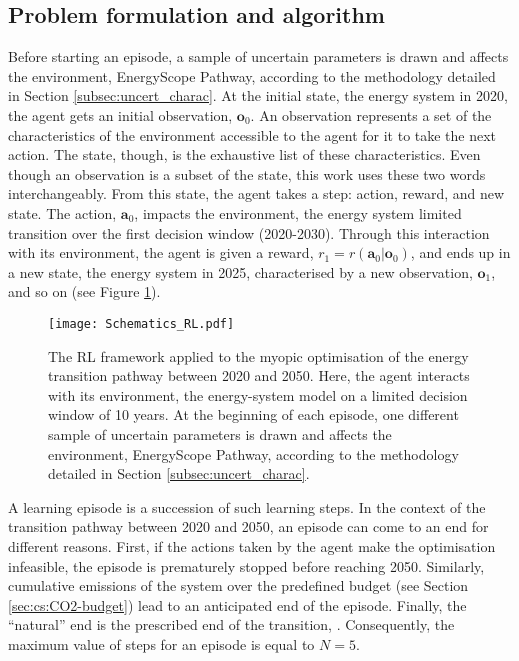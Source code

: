 \subsection{Problem formulation and algorithm}
\label{subsec:meth_RL_algo}
Before starting an episode, a sample of uncertain parameters is drawn and affects the environment, EnergyScope Pathway, according to the methodology detailed in Section \ref{subsec:uncert_charac}. At the initial state, \ie the energy system in 2020, the agent gets an initial observation, $\bm{o}_0$. An observation represents a set of the characteristics of the environment accessible to the agent for it to take the next action. The state, though, is the exhaustive list of these characteristics. Even though an observation is a subset of the state, this work uses these two words interchangeably. From this state, the agent takes a step: action, reward,  and new state. The action, $\bm{a}_0$, impacts the environment, \ie the energy system limited transition over the first decision window (2020-2030). Through this interaction with its environment, the agent is given a reward, $r_1=r\left(\bm{a}_0 | \bm{o}_0 \right)$, and ends up in a new state, \ie the energy system in 2025, characterised by a new observation, $\bm{o}_1$, and so on (see Figure \ref{fig:Schematics_RL}).


\begin{figure}[!htbp]
\centering
\texttt{[image: Schematics\_RL.pdf]}
\caption{The \Acrfull{RL} framework applied to the myopic optimisation of the energy transition pathway between 2020 and 2050. Here, the agent interacts with its environment, \ie the energy-system model on a limited decision window of 10 years. At the beginning of each episode, one different sample of uncertain parameters is drawn and affects the environment, EnergyScope Pathway, according to the methodology detailed in Section \ref{subsec:uncert_charac}.}
\label{fig:Schematics_RL}
\end{figure}

A learning episode is a succession of such learning steps. In the context of the transition pathway between 2020 and 2050, an episode can come to an end for different reasons. First, if the actions taken by the agent make the optimisation infeasible, the episode is prematurely stopped before reaching 2050. Similarly, cumulative emissions of the system over the predefined  budget (see Section \ref{sec:cs:CO2-budget}) lead to an anticipated end of the episode. Finally, the ``natural'' end is the prescribed end of the transition, . Consequently, the maximum value of steps for an episode is equal to $N=5$. 

